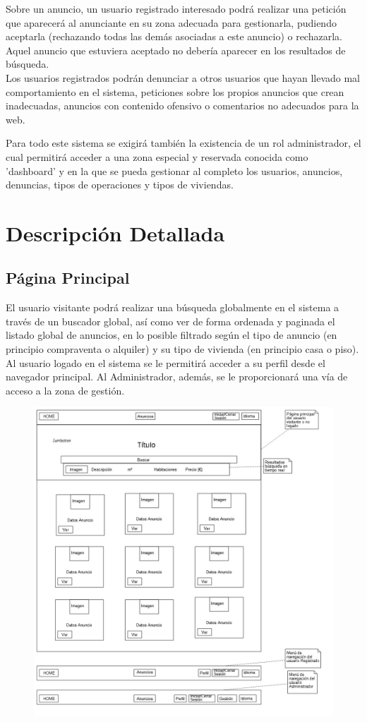 Sobre un anuncio, un usuario registrado interesado podr\'{a} realizar una petici\'{o}n que aparecer\'{a} al anunciante en su zona adecuada para gestionarla, pudiendo aceptarla (rechazando todas las dem\'{a}s asociadas a este anuncio) o rechazarla. Aquel anuncio que estuviera aceptado no deber\'{i}a aparecer en los resultados de b\'{u}squeda. \\ 

Los usuarios registrados podr\'{a}n denunciar a otros usuarios que hayan llevado mal comportamiento en el sistema, peticiones sobre los propios anuncios que crean inadecuadas, anuncios con contenido ofensivo o comentarios no adecuados para la web.

Para todo este sistema se exigir\'{a} tambi\'{e}n la existencia de un rol administrador, el cual permitir\'{a} acceder a una zona especial y reservada conocida como 'dashboard' y en la que se pueda gestionar al completo los usuarios, anuncios, denuncias, tipos de operaciones y tipos de viviendas.

\section{Descripci\'{o}n Detallada}
\subsection{P\'{a}gina Principal}


El usuario visitante podr\'{a} realizar una b\'{u}squeda globalmente en el sistema a trav\'{e}s de un buscador global, as\'{i} como ver de forma ordenada y paginada el listado global de anuncios, en lo posible filtrado seg\'{u}n el tipo de anuncio (en principio compraventa o alquiler) y su tipo de vivienda (en principio casa o piso). Al usuario logado en el sistema se le permitir\'{a} acceder a su perfil desde el navegador principal. Al Administrador, adem\'{a}s, se le proporcionar\'{a} una v\'{i}a de acceso a la zona de gesti\'{o}n.\\

\begin{figure}[h!]
\centering
\includegraphics[width=.8\textwidth]{Img/VisionAplicacion/vision_1.jpg}
\end{figure}

